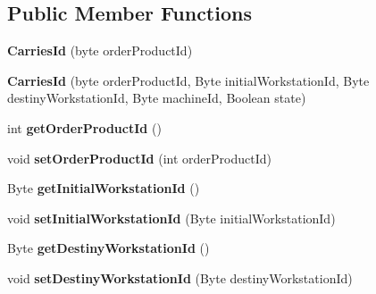 \subsection*{Public Member Functions}
\begin{DoxyCompactItemize}
\item 
\mbox{\label{classentity_1_1_carries_id_a51dae5e60540dcdb4b5c4a5c59ce8aed}} 
{\bfseries Carries\+Id} (byte order\+Product\+Id)
\item 
\mbox{\label{classentity_1_1_carries_id_a3c7555deb455253a857ecb72a99c0c1e}} 
{\bfseries Carries\+Id} (byte order\+Product\+Id, Byte initial\+Workstation\+Id, Byte destiny\+Workstation\+Id, Byte machine\+Id, Boolean state)
\item 
\mbox{\label{classentity_1_1_carries_id_a774d57bdffd816d281e67bd06bf62d21}} 
int {\bfseries get\+Order\+Product\+Id} ()
\item 
\mbox{\label{classentity_1_1_carries_id_a9049878112d9a3423f96ea5593afeb6f}} 
void {\bfseries set\+Order\+Product\+Id} (int order\+Product\+Id)
\item 
\mbox{\label{classentity_1_1_carries_id_a9f0d4a30dbe0db09bab463393bd6d1f5}} 
Byte {\bfseries get\+Initial\+Workstation\+Id} ()
\item 
\mbox{\label{classentity_1_1_carries_id_a2f055c85f701e12e2d93e054189414c6}} 
void {\bfseries set\+Initial\+Workstation\+Id} (Byte initial\+Workstation\+Id)
\item 
\mbox{\label{classentity_1_1_carries_id_a6806d0507a1e0e67cc2cb3668255a1b8}} 
Byte {\bfseries get\+Destiny\+Workstation\+Id} ()
\item 
\mbox{\label{classentity_1_1_carries_id_af9516f9d5e88954e3e72457f2ccf4f7b}} 
void {\bfseries set\+Destiny\+Workstation\+Id} (Byte destiny\+Workstation\+Id)
\item 
\mbox{\label{classentity_1_1_carries_id_a625fe262ed6c802bc07f9f4cc4a989bb}} 

\end{DoxyCompactItemize}
